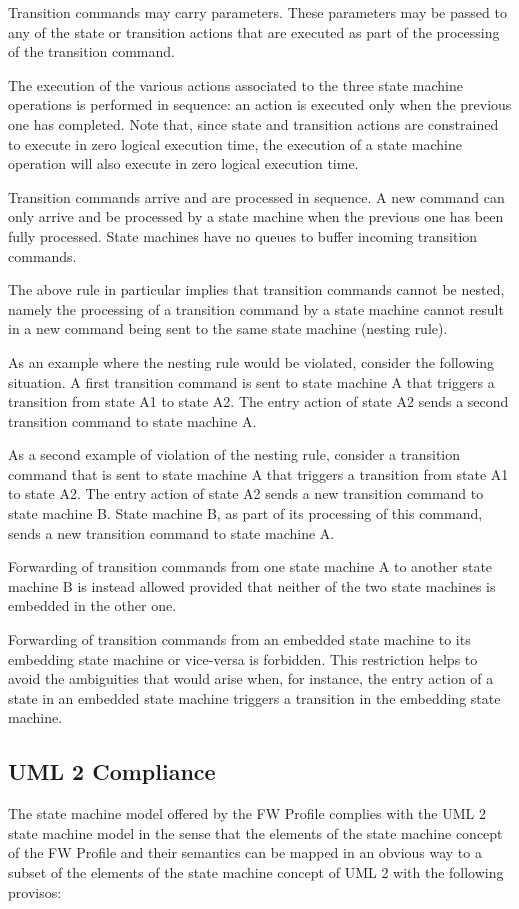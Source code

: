 Transition commands may carry parameters. These parameters may be passed to any of the state or transition actions that are executed as part of 
the processing of the transition command.

The execution of the various actions associated to the three state machine operations is performed in sequence: an action is executed only when 
the previous one has completed. Note that, since state and transition actions are constrained to execute in zero logical execution time, 
the execution of a state machine operation will also execute in zero logical execution time.  

Transition commands arrive and are processed in sequence. A new command can only arrive and be processed by a state machine when the previous one has 
been fully processed. State machines have no queues to buffer incoming transition commands.

The above rule in particular implies that transition commands cannot be nested, namely the processing of a transition command by a state machine 
cannot result in a new command being sent to the same state machine (nesting rule).

As an example where the nesting rule would be violated, consider the following situation. A first transition command is sent to state machine A that 
triggers a transition from state A1 to state A2. The entry action of state A2 sends a second transition command to state machine A. 

As a second example of violation of the nesting rule, consider  a  transition command that is sent to state machine A that triggers a transition 
from state A1 to state A2. The entry action of state A2 sends a new transition command to state machine B. State machine B, as part of its processing 
of this command, sends a new transition command to state machine A.

Forwarding of transition commands from one state machine A to another state machine B is instead allowed provided that neither of the two state machines 
is embedded in the other one. 

Forwarding of transition commands from an embedded state machine to its embedding state machine or vice-versa is forbidden. This restriction helps 
to avoid the ambiguities that would arise when, for instance, the entry action of a state in an embedded state machine triggers a transition in 
the embedding state machine.

\subsection{UML 2 Compliance}
The state machine model offered by the FW Profile complies with the UML 2 state machine
model in the sense that the elements of the state machine concept of the FW Profile and their
semantics can be mapped in an obvious way to a subset of the elements of the state machine
concept of UML 2 with the following provisos:

